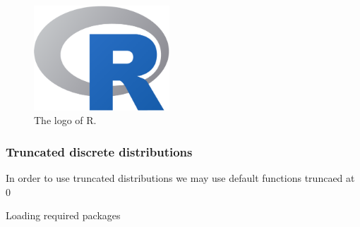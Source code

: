 \begin{Schunk}
\begin{figure}[htbp]

{\centering \includegraphics[width=2in]{Rlogo} 

}

\caption[The logo of R]{The logo of R.}\label{fig:Rlogo}
\end{figure}
\end{Schunk}

\hypertarget{truncated-discrete-distributions}{%
\subsubsection{Truncated discrete
distributions}\label{truncated-discrete-distributions}}

In order to use truncated distributions we may use default functions
truncaed at 0

Loading required packages

